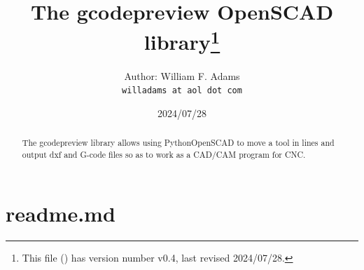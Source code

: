 \documentclass{ltxdoc}
\begin{document}

\def\fileversion{v0.4} \def\filedate{2024/07/28}



\title{The gcodepreview OpenSCAD library\thanks{This
        file (\texttt{\jobname}) has version number \fileversion, last revised
        \filedate.}}

\author{%
Author: William F. Adams\\
\texttt{willadams at aol dot com}
}
\date{\filedate}
\maketitle
\begin{abstract}
\noindent The gcodepreview library allows using PythonOpenSCAD to move a tool in lines 
and output dxf and G-code files so as to work as a CAD/\allowbreak CAM program for CNC.
\end{abstract}
\tableofcontents

\clearpage
\section{readme.md}
\end{document}
